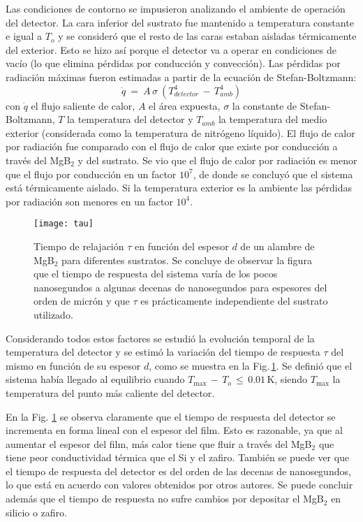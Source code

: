 Las condiciones de contorno se impusieron analizando el ambiente de operación del detector. La cara inferior del sustrato fue mantenido a temperatura constante e igual a $T_o$ y se consideró que el resto de las caras estaban aisladas térmicamente del exterior. Esto se hizo así porque el detector va a operar en condiciones de vacío (lo que elimina pérdidas por conducción y convección). Las pérdidas por radiación máximas fueron estimadas a partir de la ecuación de Stefan-Boltzmann\cite{incropera}:
\begin{equation}
\dot{q} \ = \ A\,\sigma \ (T_{detector}^4 \, - \, T_{amb}^4)
\label{eq:sb}
\end{equation}
\noindent
con $\dot{q}$ el flujo saliente de calor, $A$ el área expuesta, $\sigma$ la constante de Stefan-Boltzmann, $T$ la temperatura del detector y $T_{amb}$ la temperatura del medio exterior (considerada como la temperatura de nitrógeno líquido). El flujo de calor por radiación fue comparado con el flujo de calor que existe por conducción a través del MgB$_2$ y del sustrato. Se vio que el flujo de calor por radiación es menor que el flujo por conducción en un factor $10^{7}$, de donde se concluyó que el sistema está térmicamente aislado. Si la temperatura exterior es la ambiente las pérdidas por radiación son menores en un factor $10^{4}$.
\begin{figure}[t!]
 \begin{center}
    \texttt{[image: tau]}
 \end{center}
  \caption[Tiempo de relajación de un cable de MgB$_2$ para diferentes sustratos.]{Tiempo de relajación $\tau$ en función del espesor $d$ de un alambre de MgB$_2$ para diferentes sustratos. Se
concluye de observar la figura que el tiempo de res\-pues\-ta del sistema varía de los pocos nanosegundos a algunas decenas de
nanosegundos para espesores del orden de micrón y que $\tau$ es prácticamente independiente del sustrato utilizado.}
\label{fig:tau}
\end{figure}

Considerando todos estos factores se estudió la evolución temporal de la temperatura del detector y se estimó la variación del tiempo de respuesta $\tau$ del mismo en función de su espesor $d$, como se muestra en la Fig.\,\ref{fig:tau}. Se definió que el sistema había llegado al equilibrio cuando $T_{\text{max}} \, - \, T_o \, \leq \, 0.01$\,K, siendo $T_{\text{max}}$ la temperatura del punto más caliente del detector.

En la Fig. \ref{fig:tau} se observa claramente que el tiempo de respuesta del detector se incrementa en forma lineal con el espesor del film. Esto es razonable, ya que al aumentar el espesor del film, más calor tiene que fluir a través del MgB$_2$ que tiene peor conductividad térmica que el Si y el zafiro. También se puede ver que el tiempo de respuesta del detector es del orden de las decenas de nanosegundos, lo que está en acuerdo con valores obtenidos por otros autores\cite{Nishikawa2008}. Se puede concluir además que el tiempo de respuesta no sufre cambios por depositar el MgB$_2$ en silicio o zafiro.


